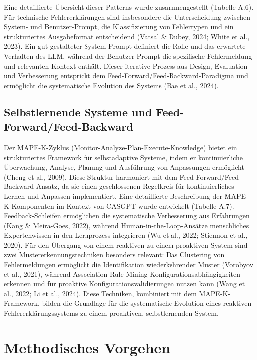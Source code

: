\documentclass[
  a4paper,
  12pt,
  oneside,
  open=any,
  BCOR=12mm,
  DIV=14,
  parskip=half*,
  headsepline,
  footsepline,
  pointlessnumbers,
  liststotoc,
  numbers=noenddot,
  listof=totoc]{scrartcl}
\begin{document}
Eine detaillierte Übersicht dieser Patterns wurde zusammengestellt
(Tabelle A.6). Für technische Fehlererklärungen sind insbesondere die
Unterscheidung zwischen System- und Benutzer-Prompt, die Klassifizierung
von Fehlertypen und ein strukturiertes Ausgabeformat entscheidend
(Vatsal \& Dubey, 2024; White et al., 2023). Ein gut gestalteter
System-Prompt definiert die Rolle und das erwartete Verhalten des LLM,
während der Benutzer-Prompt die spezifische Fehlermeldung und relevanten
Kontext enthält. Dieser iterative Prozess aus Design, Evaluation und
Verbesserung entspricht dem Feed-Forward/Feed-Backward-Paradigma und
ermöglicht die systematische Evolution des Systems (Bae et al., 2024).

\subsection{Selbstlernende Systeme und
Feed-Forward/Feed-Backward}\label{selbstlernende-systeme-und-feed-forwardfeed-backward}

Der MAPE-K-Zyklus (Monitor-Analyze-Plan-Execute-Knowledge) bietet ein
strukturiertes Framework für selbstadaptive Systeme, indem er
kontinuierliche Überwachung, Analyse, Planung und Ausführung von
Anpassungen ermöglicht (Cheng et al., 2009). Diese Struktur harmoniert
mit dem Feed-Forward/Feed-Backward-Ansatz, da sie einen geschlossenen
Regelkreis für kontinuierliches Lernen und Anpassen implementiert. Eine
detaillierte Beschreibung der MAPE-K-Komponenten im Kontext von CASGPT
wurde entwickelt (Tabelle A.7). Feedback-Schleifen ermöglichen die
systematische Verbesserung aus Erfahrungen (Kang \& Meira-Goes, 2022),
während Human-in-the-Loop-Ansätze menschliches Expertenwissen in den
Lernprozess integrieren (Wu et al., 2022; Stiennon et al., 2020). Für
den Übergang von einem reaktiven zu einem proaktiven System sind zwei
Mustererkennungstechniken besonders relevant: Das Clustering von
Fehlermeldungen ermöglicht die Identifikation wiederkehrender Muster
(Vorobyov et al., 2021), während Association Rule Mining
Konfigurationsabhängigkeiten erkennen und für proaktive
Konfigurationsvalidierungen nutzen kann (Wang et al., 2022; Li et al.,
2024). Diese Techniken, kombiniert mit dem MAPE-K-Framework, bilden die
Grundlage für die systematische Evolution eines reaktiven
Fehlererklärungssystems zu einem proaktiven, selbstlernenden System.

\section{Methodisches Vorgehen}\label{methodisches-vorgehen}
\end{document}
